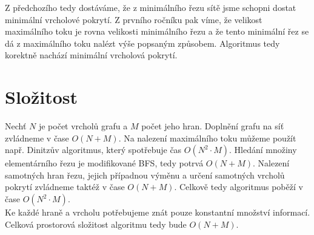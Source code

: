 \documentclass{scrartcl}
\begin{document}
Z předchozího tedy dostáváme, že z minimálního řezu sítě jsme schopni dostat minimální vrcholové pokrytí. Z prvního ročníku pak víme, že velikost maximálního toku je rovna velikosti minimálního řezu a že tento minimální řez se dá z maximálního toku nalézt výše popsaným způsobem. Algoritmus tedy korektně nachází minimální vrcholová pokrytí.

\section{Složitost}
Nechť $N$ je počet vrcholů grafu a $M$ počet jeho hran. Doplnění grafu na síť zvládneme v čase $O(N + M)$. Na nalezení maximálního toku můžeme použít např. Dinitzův algoritmus, který spotřebuje čas $O(N^2 \cdot M)$. Hledání množiny elementárního řezu je modifikované BFS, tedy potrvá $O(N + M)$. Nalezení samotných hran řezu, jejich případnou výměnu a určení samotných vrcholů pokrytí zvládneme taktéž v čase $O(N + M)$. Celkově tedy algoritmus poběží v čase $O(N^2 \cdot M)$. \\

Ke každé hraně a vrcholu potřebujeme znát pouze konstantní množství informací. Celková prostorová složitost algoritmu tedy bude $O(N + M)$.
\end{document}
